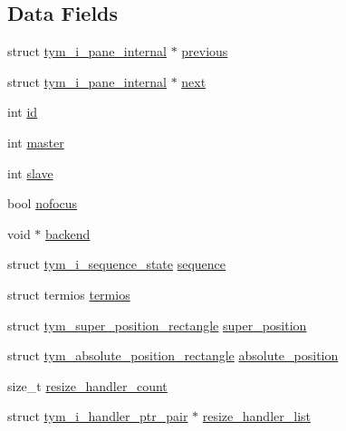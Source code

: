 \subsection*{Data Fields}
\begin{DoxyCompactItemize}
\item 
struct \hyperlink{structtym__i__pane__internal}{tym\+\_\+i\+\_\+pane\+\_\+internal} $\ast$ \hyperlink{structtym__i__pane__internal_a922aa2239bb2f3d008bc35a3caddb8c3}{previous}
\item 
struct \hyperlink{structtym__i__pane__internal}{tym\+\_\+i\+\_\+pane\+\_\+internal} $\ast$ \hyperlink{structtym__i__pane__internal_a6a0cdccfe24cb9b09ae1754cf9d4c029}{next}
\item 
int \hyperlink{structtym__i__pane__internal_a17e1f7d06c7214ae1ad4912370dcc4a1}{id}
\item 
int \hyperlink{structtym__i__pane__internal_ae32841ea8e94f488eac503995206380b}{master}
\item 
int \hyperlink{structtym__i__pane__internal_aae38651ca650725201ea0e4a7ac5e893}{slave}
\item 
bool \hyperlink{structtym__i__pane__internal_ad10df02effe8dee789bf80a8a6f85b41}{nofocus}
\item 
void $\ast$ \hyperlink{structtym__i__pane__internal_af6a6ae990267090f21c804525a89128a}{backend}
\item 
struct \hyperlink{structtym__i__sequence__state}{tym\+\_\+i\+\_\+sequence\+\_\+state} \hyperlink{structtym__i__pane__internal_acee6942f5fc8a08292cdacf9f50fcf6e}{sequence}
\item 
struct termios \hyperlink{structtym__i__pane__internal_a4d03c0c97686307362307fd44c3edd50}{termios}
\item 
struct \hyperlink{structtym__super__position__rectangle}{tym\+\_\+super\+\_\+position\+\_\+rectangle} \hyperlink{structtym__i__pane__internal_a6130559b5f02e294f71981c51535fd06}{super\+\_\+position}
\item 
struct \hyperlink{structtym__absolute__position__rectangle}{tym\+\_\+absolute\+\_\+position\+\_\+rectangle} \hyperlink{structtym__i__pane__internal_a05be638aab84faf85b300b6021b772d8}{absolute\+\_\+position}
\item 
size\+\_\+t \hyperlink{structtym__i__pane__internal_a084a6b169726095a350eddddbdd78c65}{resize\+\_\+handler\+\_\+count}
\item 
struct \hyperlink{structtym__i__handler__ptr__pair}{tym\+\_\+i\+\_\+handler\+\_\+ptr\+\_\+pair} $\ast$ \hyperlink{structtym__i__pane__internal_a563a81b01e867376d388aa77061c1ca8}{resize\+\_\+handler\+\_\+list}

\end{DoxyCompactItemize}
